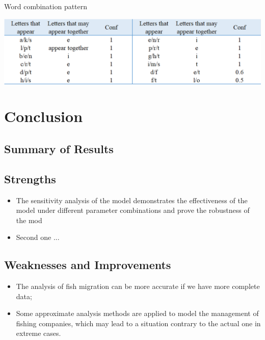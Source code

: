 \documentclass[12pt]{ctexart}
\begin{document}
\begin{table}
	\centering
	\caption{Word combination pattern}
	\includegraphics[height=8\baselineskip, width=\textwidth]{1706065292593(1).jpg}
	\label{tb:7}
\end{table}
  
  
  

  

\section{Conclusion}
\subsection{Summary of Results}

\subsection{Strengths}%
\begin{itemize}
	\item The sensitivity analysis of the model demonstrates the effectiveness of the model under different parameter combinations and prove the robustness of the mod
	\item Second one ...
\end{itemize}

\subsection{Weaknesses and Improvements}%
\begin{itemize}
	\item The analysis of fish migration can be more accurate if we have more complete data;
	\item Some approximate analysis methods are applied to model the management of fishing
	      companies, which may lead to a situation contrary to the actual one  in extreme cases.
\end{itemize}
\end{document}
